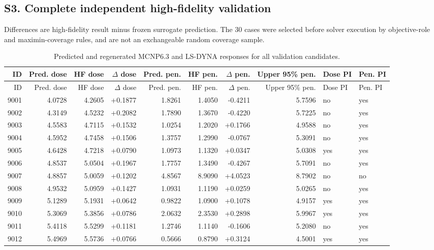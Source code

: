 \documentclass[11pt]{article}
\begin{document}
\clearpage
\begin{landscape}
\section*{S3. Complete independent high-fidelity validation}
Differences are high-fidelity result minus frozen surrogate prediction. The 30 cases were selected before solver execution by objective-role and maximin-coverage rules, and are not an exchangeable random coverage sample.
\scriptsize
\begin{longtable}{rrrrrrrrll}
\caption{Predicted and regenerated MCNP6.3 and LS-DYNA responses for all validation candidates.}\\
\toprule ID & Pred. dose & HF dose & $\Delta$ dose & Pred. pen. & HF pen. & $\Delta$ pen. & Upper 95\% pen. & Dose PI & Pen. PI \\ \midrule
\endfirsthead
\toprule ID & Pred. dose & HF dose & $\Delta$ dose & Pred. pen. & HF pen. & $\Delta$ pen. & Upper 95\% pen. & Dose PI & Pen. PI \\ \midrule
\endhead
9001 & 4.0728 & 4.2605 & +0.1877 & 1.8261 & 1.4050 & -0.4211 & 5.7596 & no & yes \\
9002 & 4.3149 & 4.5232 & +0.2082 & 1.7890 & 1.3670 & -0.4220 & 5.7225 & no & yes \\
9003 & 4.5583 & 4.7115 & +0.1532 & 1.0254 & 1.2020 & +0.1766 & 4.9588 & no & yes \\
9004 & 4.5952 & 4.7458 & +0.1506 & 1.3757 & 1.2990 & -0.0767 & 5.3091 & no & yes \\
9005 & 4.6428 & 4.7218 & +0.0790 & 1.0973 & 1.1320 & +0.0347 & 5.0308 & yes & yes \\
9006 & 4.8537 & 5.0504 & +0.1967 & 1.7757 & 1.3490 & -0.4267 & 5.7091 & no & yes \\
9007 & 4.8857 & 5.0059 & +0.1202 & 4.8567 & 8.9090 & +4.0523 & 8.7902 & no & no \\
9008 & 4.9532 & 5.0959 & +0.1427 & 1.0931 & 1.1190 & +0.0259 & 5.0265 & no & yes \\
9009 & 5.1289 & 5.1931 & +0.0642 & 0.9822 & 1.0900 & +0.1078 & 4.9157 & yes & yes \\
9010 & 5.3069 & 5.3856 & +0.0786 & 2.0632 & 2.3530 & +0.2898 & 5.9967 & yes & yes \\
9011 & 5.4118 & 5.5299 & +0.1181 & 1.2746 & 1.1140 & -0.1606 & 5.2080 & no & yes \\
9012 & 5.4969 & 5.5736 & +0.0766 & 0.5666 & 0.8790 & +0.3124 & 4.5001 & yes & yes \\

\end{longtable}
\end{landscape}
\end{document}
